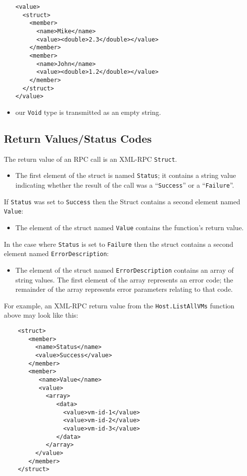 \begin{itemize}
  \begin{verbatim}
<value>
  <struct>
    <member>
      <name>Mike</name>
      <value><double>2.3</double></value>
    </member>
    <member>
      <name>John</name>
      <value><double>1.2</double></value>
    </member>
  </struct>
</value>
  \end{verbatim}

  \item our {\tt Void} type is transmitted as an empty string.

\end{itemize}

\subsection{Return Values/Status Codes}
\label{synchronous-result}

The return value of an RPC call is an XML-RPC {\tt Struct}.

\begin{itemize}
\item The first element of the struct is named {\tt Status}; it
contains a string value indicating whether the result of the call was
a ``{\tt Success}'' or a ``{\tt Failure}''.
\end{itemize}

If {\tt Status} was set to {\tt Success} then the Struct contains a second
element named {\tt Value}:
\begin{itemize}
\item The element of the struct named {\tt Value} contains the function's return value.
\end{itemize}

In the case where {\tt Status} is set to {\tt Failure} then
the struct contains a second element named {\tt ErrorDescription}:
\begin{itemize}
\item The element of the struct named {\tt ErrorDescription} contains
an array of string values. The first element of the array represents an error code;
the remainder of the array represents error parameters relating to that code.
\end{itemize}

For example, an XML-RPC return value from the {\tt Host.ListAllVMs} function above
may look like this:
\begin{verbatim}
    <struct>
       <member>
         <name>Status</name>
         <value>Success</value>
       </member>
       <member>
          <name>Value</name>
          <value>
            <array>
               <data>
                 <value>vm-id-1</value>
                 <value>vm-id-2</value>
                 <value>vm-id-3</value>
               </data>
            </array>
         </value>
       </member>
    </struct>
\end{verbatim}

